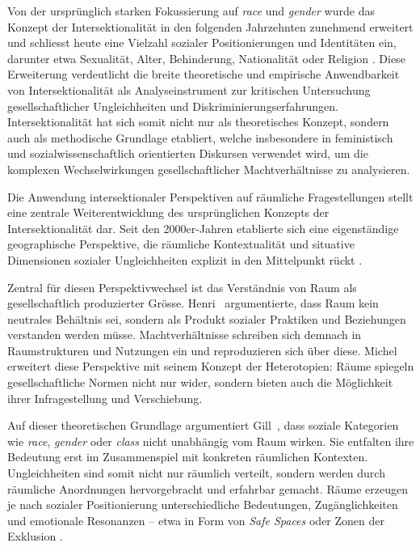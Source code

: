Von der ursprünglich starken Fokussierung auf \textit{race} und \textit{gender} wurde das Konzept der Intersektionalität in den folgenden Jahrzehnten zunehmend erweitert und schliesst heute eine Vielzahl sozialer Positionierungen und Identitäten ein, darunter etwa Sexualität, Alter, Behinderung, Nationalität oder Religion \parencite{bauerIntersectionalityQuantitativeResearch2021, bowlegInvitedReflectionQuantifying2016}. Diese Erweiterung verdeutlicht die breite theoretische und empirische Anwendbarkeit von Intersektionalität als Analyseinstrument zur kritischen Untersuchung gesellschaftlicher Ungleichheiten und Diskriminierungserfahrungen. Intersektionalität hat sich somit nicht nur als theoretisches Konzept, sondern auch als methodische Grundlage etabliert, welche insbesondere in feministisch und sozialwissenschaftlich orientierten Diskursen verwendet wird, um die komplexen Wechselwirkungen gesellschaftlicher Machtverhältnisse zu analysieren.

\vspace{2em}

Die Anwendung intersektionaler Perspektiven auf räumliche Fragestellungen stellt eine zentrale Weiterentwicklung des ursprünglichen Konzepts der Intersektionalität dar. Seit den 2000er-Jahren etablierte sich eine eigenständige geographische Perspektive, die räumliche Kontextualität und situative Dimensionen sozialer Ungleichheiten explizit in den Mittelpunkt rückt \parencite{valentineTheorizingResearchingIntersectionality2007, rodo-de-zarateIntersectionalityFeministGeographies2018}.

Zentral für diesen Perspektivwechsel ist das Verständnis von Raum als gesellschaftlich produzierter Grösse. Henri~\textcite{lefebvreProductionLespace1974} argumentierte, dass Raum kein neutrales Behältnis sei, sondern als Produkt sozialer Praktiken und Beziehungen verstanden werden müsse. Machtverhältnisse schreiben sich demnach in Raumstrukturen und Nutzungen ein und reproduzieren sich über diese. Michel~\textcite{foucaultEspacesAutres2004} erweitert diese Perspektive mit seinem Konzept der Heterotopien: Räume spiegeln gesellschaftliche Normen nicht nur wider, sondern bieten auch die Möglichkeit ihrer Infragestellung und Verschiebung.

Auf dieser theoretischen Grundlage argumentiert Gill~\textcite{valentineTheorizingResearchingIntersectionality2007}, dass soziale Kategorien wie \textit{race}, \textit{gender} oder \textit{class} nicht unabhängig vom Raum wirken. Sie entfalten ihre Bedeutung erst im Zusammenspiel mit konkreten räumlichen Kontexten. Ungleichheiten sind somit nicht nur räumlich verteilt, sondern werden durch räumliche Anordnungen hervorgebracht und erfahrbar gemacht. Räume erzeugen je nach sozialer Positionierung unterschiedliche Bedeutungen, Zugänglichkeiten und emotionale Resonanzen – etwa in Form von \textit{Safe Spaces} oder Zonen der Exklusion \parencite[\gls{vgl}][S.~548–549]{rodo-de-zarateIntersectionalityFeministGeographies2018}.

